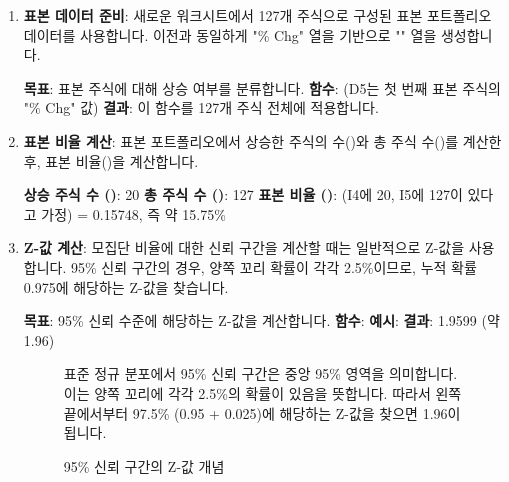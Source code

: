\documentclass[11pt,a4paper]{article}
\begin{document}
\begin{enumerate}
    \item \textbf{표본 데이터 준비}:
    새로운 워크시트에서 127개 주식으로 구성된 표본 포트폴리오 데이터를 사용합니다. 이전과 동일하게 "\% Chg" 열을 기반으로 "" 열을 생성합니다.
    \begin{tcolorbox}[title=Excel IF 함수 (표본 데이터), mybox]
        \textbf{목표}: 표본 주식에 대해 상승 여부를 분류합니다.
        \textbf{함수}:  (D5는 첫 번째 표본 주식의 "\% Chg" 값)
        \textbf{결과}: 이 함수를 127개 주식 전체에 적용합니다.
    \end{tcolorbox}

    \item \textbf{표본 비율 계산}:
    표본 포트폴리오에서 상승한 주식의 수()와 총 주식 수()를 계산한 후, 표본 비율()을 계산합니다.
    \begin{tcolorbox}[title=표본 비율 계산 결과, mybox]
        \textbf{상승 주식 수 ()}: 20
        \textbf{총 주식 수 ()}: 127
        \textbf{표본 비율 ()}:  (I4에 20, I5에 127이 있다고 가정) = 0.15748, 즉 약 15.75\%
    \end{tcolorbox}

    \item \textbf{Z-값 계산}:
    모집단 비율에 대한 신뢰 구간을 계산할 때는 일반적으로 Z-값을 사용합니다. 95\% 신뢰 구간의 경우, 양쪽 꼬리 확률이 각각 2.5\%이므로, 누적 확률 0.975에 해당하는 Z-값을 찾습니다.
    \begin{tcolorbox}[title=Excel NORM.S.INV 함수 사용법, mybox]
        \textbf{목표}: 95\% 신뢰 수준에 해당하는 Z-값을 계산합니다.
        \textbf{함수}: 
        \textbf{예시}: 
        \textbf{결과}: 1.9599 (약 1.96)
    \end{tcolorbox}
    \begin{figure}[h!]
        \centering
        \begin{tcolorbox}[title=Z-값 시각적 설명, mybox]
            표준 정규 분포에서 95\% 신뢰 구간은 중앙 95\% 영역을 의미합니다. 이는 양쪽 꼬리에 각각 2.5\%의 확률이 있음을 뜻합니다. 따라서 왼쪽 끝에서부터 97.5\% (0.95 + 0.025)에 해당하는 Z-값을 찾으면 1.96이 됩니다.
        \end{tcolorbox}
        \caption{95\% 신뢰 구간의 Z-값 개념}
        \label{fig:z_value_concept}
    \end{figure}


\end{enumerate}
\end{document}
